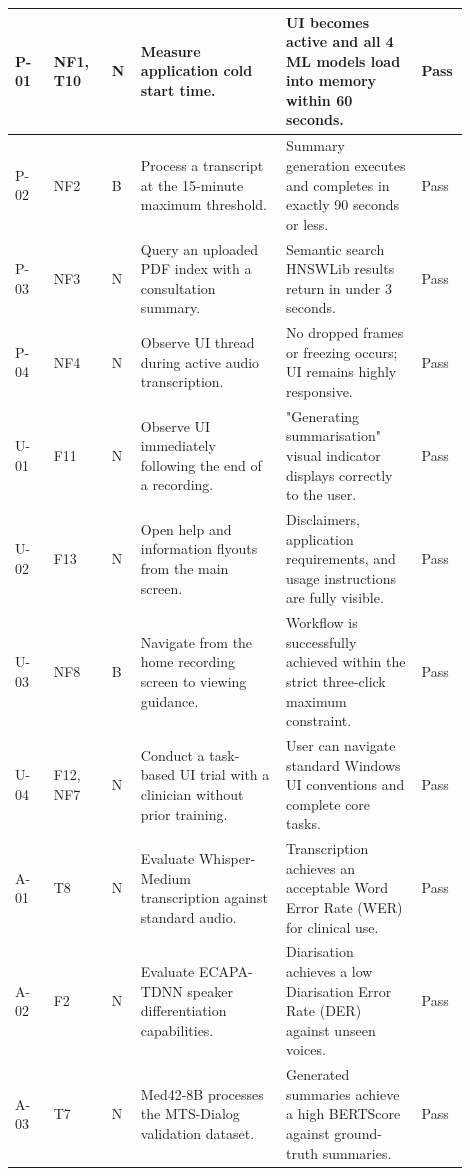 \begin{longtable}{|p{0.08\linewidth}|p{0.12\linewidth}|p{0.06\linewidth}|p{0.30\linewidth}|p{0.28\linewidth}|p{0.06\linewidth}|}
P-01 & NF1, T10 & N & Measure application cold start time. & UI becomes active and all 4 ML models load into memory within 60 seconds. & Pass \\ \hline
P-02 & NF2 & B & Process a transcript at the 15-minute maximum threshold. & Summary generation executes and completes in exactly 90 seconds or less. & Pass \\ \hline
P-03 & NF3 & N & Query an uploaded PDF index with a consultation summary. & Semantic search HNSWLib results return in under 3 seconds. & Pass \\ \hline
P-04 & NF4 & N & Observe UI thread during active audio transcription. & No dropped frames or freezing occurs; UI remains highly responsive. & Pass \\ \hline

U-01 & F11 & N & Observe UI immediately following the end of a recording. & "Generating summarisation" visual indicator displays correctly to the user. & Pass \\ \hline
U-02 & F13 & N & Open help and information flyouts from the main screen. & Disclaimers, application requirements, and usage instructions are fully visible. & Pass \\ \hline
U-03 & NF8 & B & Navigate from the home recording screen to viewing guidance. & Workflow is successfully achieved within the strict three-click maximum constraint. & Pass \\ \hline
U-04 & F12, NF7 & N & Conduct a task-based UI trial with a clinician without prior training. & User can navigate standard Windows UI conventions and complete core tasks. & Pass \\ \hline

A-01 & T8 & N & Evaluate Whisper-Medium transcription against standard audio. & Transcription achieves an acceptable Word Error Rate (WER) for clinical use. & Pass \\ \hline
A-02 & F2 & N & Evaluate ECAPA-TDNN speaker differentiation capabilities. & Diarisation achieves a low Diarisation Error Rate (DER) against unseen voices. & Pass \\ \hline
A-03 & T7 & N & Med42-8B processes the MTS-Dialog validation dataset. & Generated summaries achieve a high BERTScore against ground-truth summaries. & Pass \\ \hline


\end{longtable}
